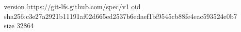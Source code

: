 version https://git-lfs.github.com/spec/v1
oid sha256:c3e27a2921b11191af02d665ed2537b6edaef1bf9545cb88fe4eac593524e0b7
size 32864
